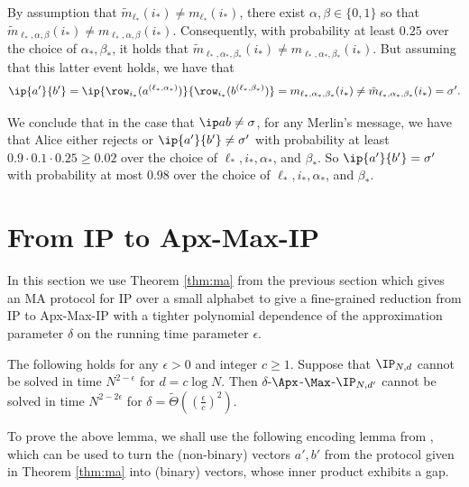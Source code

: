 \documentclass[11pt]{article}
\begin{document}
 By assumption that $\tilde m_{\ell_*} (i_*) \neq m_{\ell_*} (i_*)$, there exist $\alpha, \beta \in \{0,1\}$ so that $\tilde m_{\ell_*,\alpha,\beta}(i_*) \neq  m_{\ell_*,\alpha,\beta}(i_*)$. Consequently, with probability at least $0.25$ over the choice of $\alpha_*, \beta_*$, it holds that 
$\tilde m_{\ell_*,\alpha_*,\beta_*}(i_*) \neq  m_{\ell_*,\alpha_*,\beta_*}(i_*)$. 
But assuming that this latter event holds, we have that 
$$ \ip {a'} {b'} = \ip {\row_{i_*} (a^{(\ell_*, \alpha_*)})} {\row_{i_*} (b^{(\ell_*,  \beta_*)})} = 
m_{\ell_*,\alpha_*,\beta_*}(i_*) \neq \tilde m_{\ell_*,\alpha_*,\beta_*}(i_*) = \sigma' .$$

We conclude that in the case that $\ip a b \neq \sigma$, for any Merlin's message, we have that Alice either rejects or $\ip {a'} {b'} \neq \sigma'$ with probability at least $0.9 \cdot 0.1 \cdot 0.25 \geq 0.02$ over the choice of $\ell_*, i_*, \alpha_*$, and  $\beta_*$. So $\ip {a'} {b'} = \sigma'$ with probability at most $0.98$ over the choice of $\ell_*, i_*, \alpha_*$, and  $\beta_*$. 



\section{From IP to Apx-Max-IP}\label{sec:ip_to_apx_max_ip}


In this section we use Theorem \ref{thm:ma} from the previous section which gives an MA protocol for IP over a small alphabet to give a fine-grained reduction from IP to Apx-Max-IP with a tighter polynomial dependence of the approximation parameter $\delta$ on the running time parameter $\epsilon$.

\begin{lem}\label{lem:ip_to_maxip}
The following holds for any $\epsilon >0$ and integer $c \geq 1$.
Suppose that $\IP_{N,d}$ cannot be solved in time $N^{2-\epsilon}$ for $d = c \log N$. Then $\delta$-$\Apx$-$\Max$-$\IP_{N,d'}$ cannot be solved in time $N^{2-2\epsilon}$ for $\delta = \tilde \Theta( ( \frac \epsilon c)^2 )$. 
\end{lem}

To prove the above lemma, we shall use the following encoding lemma from \cite{CW19}, which can be used to turn the (non-binary) vectors $a',b'$ from the protocol given in Theorem \ref{thm:ma} into (binary) vectors, whose inner product exhibits a gap.
\end{document}
